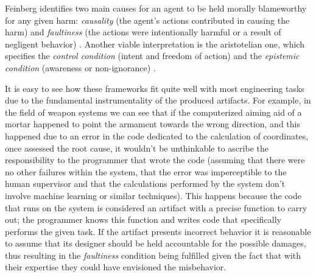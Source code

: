 Feinberg identifies two main causes for an agent to be held morally blameworthy for any given harm: \textit{causality} (the agent's actions contributed in causing the harm) and \textit{faultiness} (the actions were intentionally harmful or a result of negligent behavior) \parencite{FEISC}.
Another viable interpretation is the aristotelian one, which specifies the \textit{control condition} (intent and freedom of action) and the \textit{epistemic condition} (awareness or non-ignorance) \parencite{FISRAC}.

It is easy to see how these frameworks fit quite well with most engineering tasks due to the fundamental instrumentality of the produced artifacts.
For example, in the field of weapon systems we can see that if the computerized aiming aid of a mortar happened to point the armament towards the wrong direction, and this happened due to an error in the code dedicated to the calculation of coordinates, once assessed the root cause, it wouldn't be unthinkable to ascribe the responsibility to the programmer that wrote the code (assuming that there were no other failures within the system, that the error was imperceptible to the human supervisor and that the calculations performed by the system don't involve machine learning or similar techniques).
This happens because the code that runs on the system is considered an artifact with a precise function to carry out; the programmer knows this function and writes code that specifically performs the given task.
If the artifact presents incorrect behavior it is reasonable to assume that its designer should be held accountable for the possible damages, thus resulting in the \textit{faultiness} condition being fulfilled given the fact that with their expertise they could have envisioned the misbehavior.

